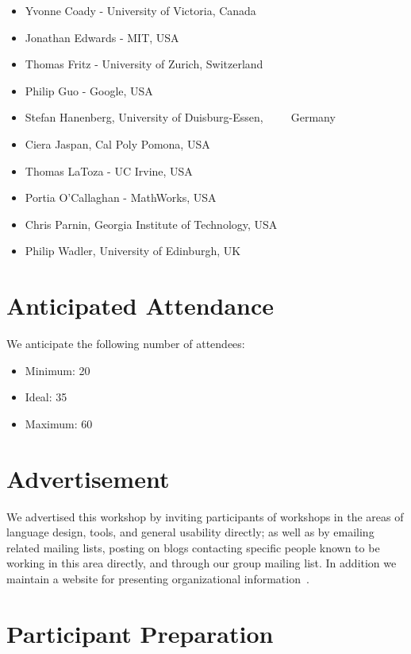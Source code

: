 \documentclass[10pt]{sigplanconf}
\begin{document}
\begin{itemize}
\item Yvonne Coady - University of Victoria, Canada
\item Jonathan Edwards - MIT, USA
\item Thomas Fritz - University of Zurich, Switzerland
\item Philip Guo - Google, USA
\item Stefan Hanenberg, University of Duisburg-Essen,\,\,\,\,\,\,\,\,\,\,\,\,\, Germany
\item Ciera Jaspan, Cal Poly Pomona, USA
\item Thomas LaToza - UC Irvine, USA
\item Portia O'Callaghan - MathWorks, USA
\item Chris Parnin, Georgia Institute of Technology, USA
\item Philip Wadler, University of Edinburgh, UK
\end{itemize}


\section{Anticipated Attendance}

We anticipate the following number of attendees:

\begin{itemize}
\item Minimum: 20 
\item Ideal: 35
\item Maximum: 60 
\end{itemize}

\section{Advertisement}

We advertised this workshop by inviting participants of workshops
in the areas of language design, tools, and general usability
directly; as well as by emailing related mailing lists, posting on
blogs contacting specific people known to be working in this area directly,
and through our group mailing list. In addition we maintain a website for presenting organizational information~\cite{website}.

\section{Participant Preparation}\label{preparation}
\end{document}
